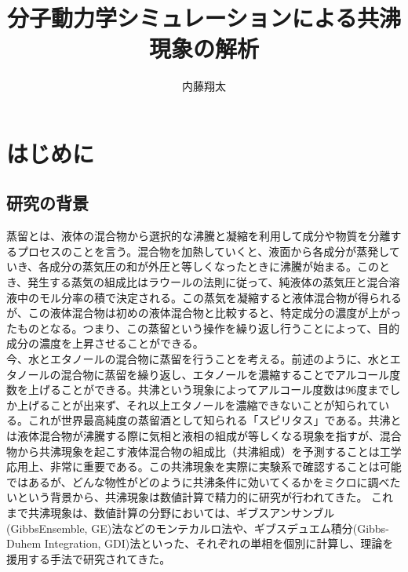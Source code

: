 \documentclass[titlepage]{jsreport}
\title{分子動力学シミュレーションによる共沸現象の解析}
\author{内藤翔太}
\begin{document}
\maketitle
{}

\tableofcontents
\pagestyle{plain}
\setcounter{page}{1}

\chapter{はじめに} \label{chap:introduction}

\section{研究の背景} \label{introduction:background}
蒸留とは、液体の混合物から選択的な沸騰と凝縮を利用して成分や物質を分離するプロセスのことを言う。混合物を加熱していくと、液面から各成分が蒸発していき、各成分の蒸気圧の和が外圧と等しくなったときに沸騰が始まる。このとき、発生する蒸気の組成比はラウールの法則に従って、純液体の蒸気圧と混合溶液中のモル分率の積で決定される。この蒸気を凝縮すると液体混合物が得られるが、この液体混合物は初めの液体混合物と比較すると、特定成分の濃度が上がったものとなる。つまり、この蒸留という操作を繰り返し行うことによって、目的成分の濃度を上昇させることができる。\\
今、水とエタノールの混合物に蒸留を行うことを考える。前述のように、水とエタノールの混合物に蒸留を繰り返し、エタノールを濃縮することでアルコール度数を上げることができる。共沸という現象によってアルコール度数は96度までしか上げることが出来ず、それ以上エタノールを濃縮できないことが知られている。これが世界最高純度の蒸留酒として知られる「スピリタス」である。共沸とは液体混合物が沸騰する際に気相と液相の組成が等しくなる現象を指すが、混合物から共沸現象を起こす液体混合物の組成比（共沸組成）を予測することは工学応用上、非常に重要である。この共沸現象を実際に実験系で確認することは可能ではあるが、どんな物性がどのように共沸条件に効いてくるかをミクロに調べたいという背景から、共沸現象は数値計算で精力的に研究が行われてきた。
これまで共沸現象は、数値計算の分野においては、ギブスアンサンブル(GibbsEnsemble, GE)法などのモンテカルロ法や、ギブスデュエム積分(Gibbs-Duhem Integration, GDI)法といった、それぞれの単相を個別に計算し、理論を援用する手法で研究されてきた。
\end{document}
